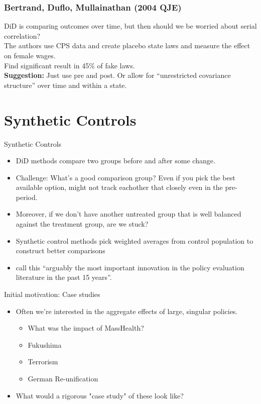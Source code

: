 \begin{frame}[c]\frametitle{Bertrand, Duflo, Mullainathan (2004 QJE)}
    
DiD is comparing outcomes over time, but then should we be worried about serial correlation?\\[1em]

The authors use CPS data and create placebo state laws and measure the effect on female wages. \\[1em]

Find significant result in 45\% of fake laws. \\[1em]

\textbf{Suggestion:} Just use pre and post. Or allow for ``unrestricted covariance structure'' over time and within a state. 




\end{frame}


\section{Synthetic Controls}

\begin{frame}{Synthetic Controls}
  \begin{itemize}
    \item DiD methods compare two groups before and after some change. 
    \item Challenge: What's a good comparison group? Even if you pick the best available option, might not track eachother that closely even in the pre-period. 
    \item Moreover, if we don't have another untreated group that is well balanced against the treatment group, are we stuck?
    \item Synthetic control methods pick weighted averages from control population to construct better comparisons \citep{abadie2003economic, abadie2010synthetic}
    \item \citet{athey2017state} call this ``arguably the most important innovation in the policy evaluation literature in the past 15 years''.
  \end{itemize}              
\end{frame}

\begin{frame}{Initial motivation: Case studies}
  \begin{itemize}
    \item Often we're interested in the aggregate effects of large, singular policies. 
    \begin{itemize}
      \item What was the impact of MassHealth?
      \item Fukushima 
      \item Terrorism 
      \item German Re-unification
    \end{itemize}  
    \item What would a rigorous "case study" of these look like?
  \end{itemize}              
\end{frame}

